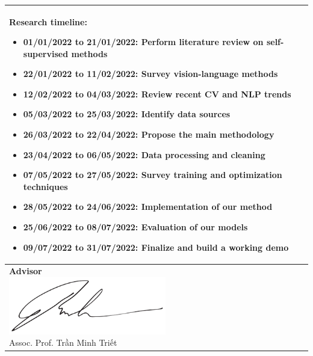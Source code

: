 \begin{longtable}{|p{{{80mm}}}|c|}
{}\\
\hline

\multicolumn{2}{|m{\linewidth}|}{
\textbf{Research timeline}:

\begin{itemize}
    \item 01/01/2022 to 21/01/2022: Perform literature review on self-supervised
methods
    \item 22/01/2022 to 11/02/2022: Survey vision-language methods
    \item 12/02/2022 to 04/03/2022: Review recent CV and NLP trends
    \item 05/03/2022 to 25/03/2022: Identify data sources
    \item 26/03/2022 to 22/04/2022: Propose the main methodology
    \item 23/04/2022 to 06/05/2022: Data processing and cleaning
    \item 07/05/2022 to 27/05/2022: Survey training and optimization techniques
    \item 28/05/2022 to 24/06/2022: Implementation of our method
    \item 25/06/2022 to 08/07/2022: Evaluation of our models
    \item 09/07/2022 to 31/07/2022: Finalize and build a working demo

\end{itemize}


}\\
\hline

\makecell[c]{\textbf{Advisor} \\ 
\includegraphics[height=2.5cm]{resources/signatures/pmkhoi.png} \\ Assoc. Prof. Trần Minh Triết } & 


\end{longtable}

